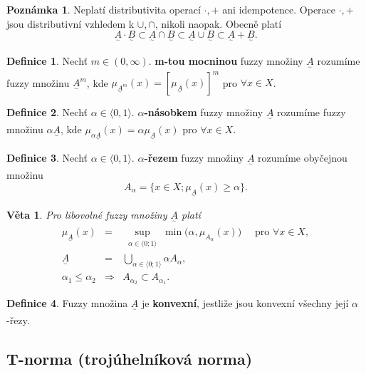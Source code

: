 \documentclass[a4]{report}
\newcommand{\fA}{\underset{^\sim}A}
\newcommand{\fB}{\underset{^\sim}B}
\newcommand{\muA}{\mu_{\fA}}
\newtheorem{theorem}{Věta}
\theoremstyle{definition}
\newtheorem{definition}{Definice}[section]
\newtheorem{remark}{Poznámka}[section]
\begin{document}
{\begin{remark}
Neplatí distributivita operací $\cdot, +$ ani idempotence. Operace $\cdot, +$ jsou distributivní vzhledem k $\cup, \cap$, nikoli naopak. Obecně platí
\begin{equation*}
\fA \cdot \fB \subset \fA \cap \fB \subset \fA \cup \fB \subset \fA + \fB.
\end{equation*}
\end{remark}

\begin{definition}
Nechť $m \in (0, \infty)$. \textbf{m-tou mocninou} fuzzy množiny $\fA$ rozumíme fuzzy množinu $\fA^m$, kde $\mu_{\fA^m}(x)=[\muA(x)]^m$ pro $\forall x \in X$.
\end{definition}

\begin{definition}
Nechť $\alpha \in \langle 0, 1 \rangle$. {\boldmath$\alpha$}\textbf{-násobkem} fuzzy množiny $\fA$ rozumíme fuzzy množinu $\alpha\fA$, kde $\mu_{\alpha\fA}(x)=\alpha\muA(x)$ pro $\forall x \in X$.
\end{definition}

\begin{definition}
Nechť $\alpha \in \langle 0, 1 \rangle$. {\boldmath$\alpha$}\textbf{-řezem} fuzzy množiny $\fA$ rozumíme obyčejnou množinu
\begin{equation*}
A_{\alpha} = \lbrace x \in X; \muA(x) \geq \alpha \rbrace.
\end{equation*}
\end{definition}

\begin{theorem}
Pro libovolné fuzzy množiny $\fA$ platí
\begin{eqnarray*}
\muA(x) &=& \sup_{\substack{\alpha \in (0;1\rangle}} \min \big(\alpha, \mu_{A_{\alpha}}(x)\big) \quad \text{ pro } \forall x \in X, \\
\fA &=& \bigcup\limits_{\alpha \in \langle 0;1 \rangle} \alpha A_{\alpha}, \\
\alpha_1 \leq \alpha_2 &\Rightarrow& A_{\alpha_2} \subset A_{\alpha_1}.
\end{eqnarray*}
\end{theorem}

\begin{definition}
Fuzzy množina $\fA$ je \textbf{konvexní}, jestliže jsou konvexní všechny její $\alpha$-řezy.
\end{definition}

\subsection{T-norma (trojúhelníková norma)}

}
\end{document}
